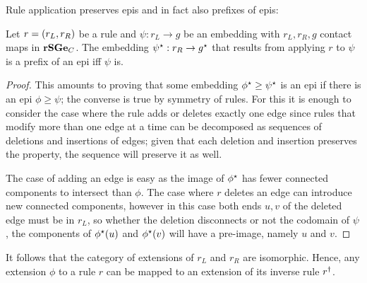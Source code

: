 Rule application preserves epis
and in fact also prefixes of epis:
\begin{lemma}
  \label{lem:epi-prefix}
  Let $r = \left(r_L,r_R\right)$ be a rule
  and $\psi: r_L \to g$ be an embedding
  with $r_L,r_R,g$ contact maps in $\mathbf{rSGe}_C$.
  The embedding $\psi^\star: r_R \to g^\star$
  that results from applying $r$ to $\psi$
  is a prefix of an epi iff $\psi$ is.
\end{lemma}
\begin{proof}
  This amounts to proving that
  some embedding $\phi^\star \geq \psi^\star$
  is an epi if there is an epi $\phi \geq \psi$;
  the converse is true by symmetry of rules.
  For this it is enough to consider the case
  where the rule adds or deletes exactly one edge
  since rules that modify more than one edge at a time
  can be decomposed as sequences of deletions and insertions of edges;
  given that each deletion and insertion preserves the property,
  the sequence will preserve it as well.

  The case of adding an edge is easy as the image of $\phi^\star$
  has fewer connected components to intersect than $\phi$.
  The case where $r$ deletes an edge
  can introduce new connected components,
  however in this case both ends $u,v$
  of the deleted edge must be in $r_L$,
  so whether the deletion disconnects or not the codomain of $\psi$,
  the components of $\phi^\star(u)$ and $\phi^\star(v)$
  will have a pre-image, namely $u$ and $v$.
\end{proof}

It follows that the category of extensions
of $r_L$ and $r_R$ are isomorphic.
Hence, any extension $\phi$ to a rule $r$ can be mapped to
an extension of its inverse rule $r^\dagger$.

